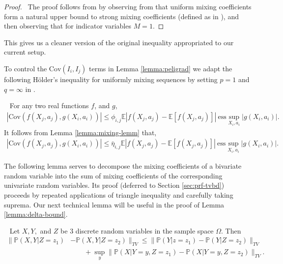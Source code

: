 \documentclass[opre,sglanonrev]{informs4}
\numberwithin{equation}{section}
\newcommand{\lv}{\left|}
\newcommand{\rv}{\right|}
\newcommand{\Cov}{\mathrm{Cov}}
\newcommand{\Pbb}{\mathbb{P}}
\newcommand{\prob}{\Pbb}
\newcommand{\expec}{\mathbb{E}}
\newcommand{\probl}{\prob}
\begin{document}
\begin{APPENDICES}
{\begin{lemma}
\end{lemma}
\begin{proof} \
The proof follows from \cite[eqn. 2.1]{merlevede2009bernstein} by observing from \citet[eqn. 1.12]{bradley} that uniform mixing coefficients form a natural upper bound to strong mixing coefficients (defined as in \citet[eqn. 1.1]{bradley}), and then observing that for indicator variables $M=1$.
\end{proof}
\begin{remark}
This gives us a cleaner version of the original inequality appropriated to our current setup.
\end{remark}
}
{To control the $\Cov(I_i,I_j)$ terms in Lemma \ref{lemma:peligrad} we adapt the following H\"older's inequality for uniformly mixing sequences by setting $p=1$ and $q=\infty$ in \citet[Theorem A.6]{hall2014martingale}.
\begin{lemma}~\label{lemma:hall-holder's}
For any two real functions $f$, and $g$,
\begin{align*}
    |\Cov(f(X_{j},a_j),g(X_{i},a_{i}))|\leq \phi_{i,j}\expec\lv 
    f(X_{j},a_j)-\expec[f(X_{j},a_j)]\rv\ \mathrm{ess }\sup_{X_i,a_i}\lv g(X_{i},a_i)\rv.
\end{align*}
It follows from Lemma \ref{lemma:mixing-lemm} that,
\begin{align*}
    |\Cov(f(X_{j},a_j),g(X_{i},a_{i}))|\leq \bar\eta_{i,j}\expec\lv 
    f(X_{j},a_j)-\expec[f(X_{j},a_j)]\rv\ \mathrm{ess }\sup_{X_i,a_i}\lv g(X_{i},a_i)\rv.
\end{align*}
\end{lemma}
}
The following lemma serves to decompose the mixing coefficients of a bivariate random variable into the sum of mixing coefficients of the corresponding univariate random variables. Its proof (deferred to Section \ref{sec:prf-tvbd}) proceeds by repeated applications of triangle inequality and carefully taking suprema. Our next technical lemma will be useful in the proof of Lemma \ref{lemma:delta-bound}.
\begin{lemma}~\label{lemma:tv-bound}
Let $X,Y,$ and $Z$ be 3 discrete random variables in the sample space $\Omega$. Then
    \begin{align*}
        \lVert \probl(X,Y|Z=z_1)& -\probl(X,Y|Z=z_2) \rVert_{TV} \leq \lVert \probl(Y|z=z_1)-\probl(Y|Z=z_2) \rVert_{TV}\\
        & \qquad +\sup_y\lVert \probl(X|Y=y,Z=z_1)-\probl(X|Y=y,Z=z_2) \rVert_{TV}.
    \end{align*}
\end{lemma}

\end{APPENDICES}
\end{document}
